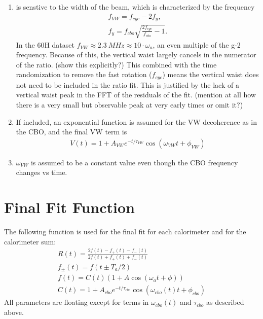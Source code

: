 \begin{enumerate}
	\item{\wa is senstive to the width of the beam, which is characterized by the frequency 
		\begin{gather*}
			f_{VW} = f_{cyc} - 2f_{y}, \\
			f_{y} = f_{cbo} \sqrt{\frac{2f_{cyc}}{f_{cbo}} - 1}.
		\end{gather*}
	In the 60H dataset $f_{VW} \approx \SI{2.3}{MHz} \approx 10 \cdot \omega_{a}$, an even multiple of the g-2 frequency. Because of this, the vertical waist largely cancels in the numerator of the ratio. (show this explicitly?) This combined with the time randomization to remove the fast rotation ($f_{cyc}$) means the vertical waist does not need to be included in the ratio fit. This is justified by the lack of a vertical waist peak in the FFT of the residuals of the fit. (mention at all how there is a very small but observable peak at very early times or omit it?)
	}
	\item{If included, an exponential function is assumed for the VW decoherence as in the CBO, and the final VW term is 
		\begin{gather*}
				V(t) = 1 + A_{VW} e^{-t/\tau_{VW}} \cos(\omega_{VW}t + \phi_{VW})
		\end{gather*}
	}
	\item{$\omega_{VW}$ is assumed to be a constant value even though the CBO frequency changes vs time.}
\end{enumerate}


\section{Final Fit Function}

The following function is used for the final fit for each calorimeter and for the calorimeter sum:
\begin{gather*}
		R(t) = \frac{2f(t) - f_{+}(t) - f_{-}(t)}{2f(t) + f_{+}(t) + f_{-}(t)} \\[10pt]
		f_{\pm}(t) = f(t \pm T_{a}/2) \\[10pt]
		f(t) = C(t) (1 + A \cos(\omega_{a}t + \phi)) \\[10pt]
		C(t) = 1 + A_{cbo} e^{-t/\tau_{cbo}} \cos(\omega_{cbo}(t)t + \phi_{cbo})
\end{gather*}
All parameters are floating except for terms in $\omega_{cbo}(t)$ and $\tau_{cbo}$ as described above.



